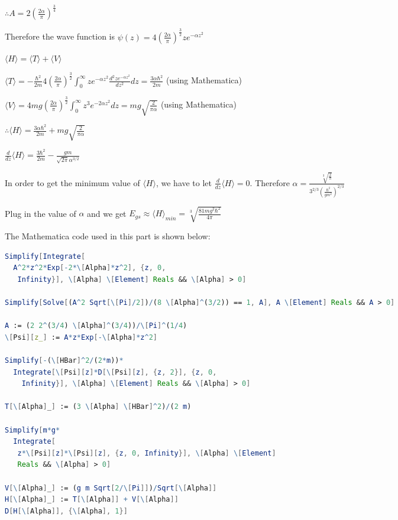 \documentclass[12pt]{article}
\begin{document}
\begin{spacing}{2.0}
$\therefore A=2\left(\frac{2\alpha}{\pi}\right)^{\frac{3}{4}}$

Therefore the wave function is $\psi(z)= 4\left(\frac{2\alpha}{\pi}\right)^{\frac{3}{2}} ze^{-\alpha z^2}$

$\langle H \rangle= \langle T \rangle + \langle V \rangle$

$\langle T \rangle= -\frac{\hbar^2}{2m} 4\left(\frac{2\alpha}{\pi}\right)^{\frac{3}{2}} \int_{0}^{\infty} ze^{-\alpha z^2} \frac{d^2 ze^{-\alpha z^2}}{d z^2} dz = \frac{3 \alpha  \hbar ^2}{2 m}$ (using Mathematica)

$\langle V \rangle= 4mg\left(\frac{2\alpha}{\pi}\right)^{\frac{3}{2}} \int_{0}^{\infty} z^3 e^{-2\alpha z^2} dz = mg\sqrt{\frac{2}{\pi \alpha}}$ (using Mathematica)

$\therefore \langle H \rangle= \frac{3 \alpha  \hbar ^2}{2 m} + mg\sqrt{\frac{2}{\pi \alpha}}$

$\frac{d}{dz} \langle H \rangle = \frac{3 \hbar ^2}{2 m}-\frac{g m}{\sqrt{2 \pi } \alpha ^{3/2}}$

In order to get the minimum value of $\langle H \rangle$, we have to let $\frac{d}{dz} \langle H \rangle=0$. Therefore $\alpha = \frac{\sqrt[3]{\frac{2}{\pi }}}{3^{2/3} \left(\frac{\hbar ^2}{g m^2}\right)^{2/3}}$

Plug in the value of $\alpha$ and we get $E_{gs} \approx \langle H \rangle_{min} = \sqrt[3]{\frac{81mg^2\hbar^2}{4\pi}}$

The Mathematica code used in this part is shown below:

\begin{lstlisting}[language=Mathematica,breaklines=true,frame=single]
Simplify[Integrate[
  A^2*z^2*Exp[-2*\[Alpha]*z^2], {z, 0,
   Infinity}], \[Alpha] \[Element] Reals && \[Alpha] > 0]

Simplify[Solve[(A^2 Sqrt[\[Pi]/2])/(8 \[Alpha]^(3/2)) == 1, A], A \[Element] Reals && A > 0]

A := (2 2^(3/4) \[Alpha]^(3/4))/\[Pi]^(1/4)
\[Psi][z_] := A*z*Exp[-\[Alpha]*z^2]

Simplify[-(\[HBar]^2/(2*m))*
  Integrate[\[Psi][z]*D[\[Psi][z], {z, 2}], {z, 0,
    Infinity}], \[Alpha] \[Element] Reals && \[Alpha] > 0]

T[\[Alpha]_] := (3 \[Alpha] \[HBar]^2)/(2 m)

Simplify[m*g*
  Integrate[
   z*\[Psi][z]*\[Psi][z], {z, 0, Infinity}], \[Alpha] \[Element]
   Reals && \[Alpha] > 0]

V[\[Alpha]_] := (g m Sqrt[2/\[Pi]])/Sqrt[\[Alpha]]
H[\[Alpha]_] := T[\[Alpha]] + V[\[Alpha]]
D[H[\[Alpha]], {\[Alpha], 1}]


\end{lstlisting}
\end{spacing}
\end{document}
